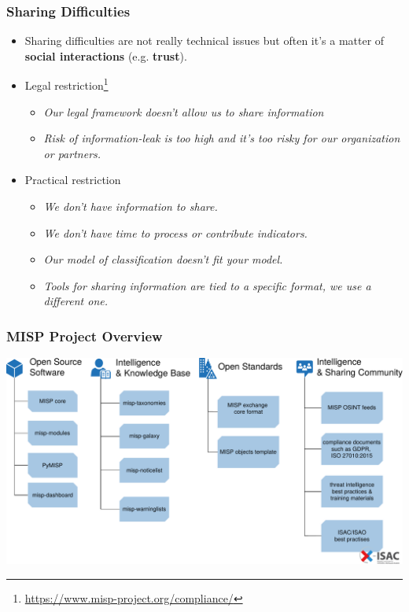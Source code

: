 \begin{frame}
\frametitle{Sharing Difficulties}
        \begin{itemize}
                \item Sharing difficulties are not really technical issues but often it's a matter of {\bf social interactions} (e.g. {\bf trust}).
                \item Legal restriction\footnote{\url{https://www.misp-project.org/compliance/}}
                        \begin{itemize}
                                \item \textit{Our legal framework doesn't allow us to share information}
                                \item \textit{Risk of information-leak is too high and it's too risky for our organization or partners.}
                        \end{itemize}
                \item Practical restriction
                        \begin{itemize}
                                \item \textit{We don't have information to share.}
                                \item \textit{We don't have time to process or contribute indicators.}
                                \item \textit{Our model of classification doesn't fit your model.}
                                \item \textit{Tools for sharing information are tied to a specific format, we use a different one.}
                        \end{itemize}
        \end{itemize}
\end{frame}


\begin{frame}
    \frametitle{MISP Project Overview}
    \includegraphics[scale=0.35]{misp-overview-simplified.pdf}
\end{frame}

